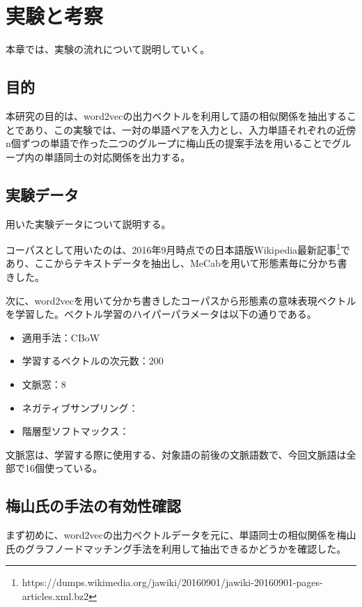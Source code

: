 \chapter{実験と考察}
本章では、実験の流れについて説明していく。

\section{目的}
本研究の目的は、word2vecの出力ベクトルを利用して語の相似関係を抽出することであり、この実験では、一対の単語ペアを入力とし、入力単語それぞれの近傍n個ずつの単語で作った二つのグループに梅山氏の提案手法を用いることでグループ内の単語同士の対応関係を出力する。

\section{実験データ}
用いた実験データについて説明する。

コーパスとして用いたのは、2016年9月時点での日本語版Wikipedia最新記事\footnote{https://dumps.wikimedia.org/jawiki/20160901/jawiki-20160901-pages-articles.xml.bz2}であり、ここからテキストデータを抽出し、MeCabを用いて形態素毎に分かち書きした。

次に、word2vecを用いて分かち書きしたコーパスから形態素の意味表現ベクトルを学習した。ベクトル学習のハイパーパラメータは以下の通りである。
\begin{itemize}
  \item 適用手法：CBoW
  \item 学習するベクトルの次元数：200
  \item 文脈窓：8
  \item ネガティブサンプリング：
  \item 階層型ソフトマックス：
\end{itemize}
文脈窓は、学習する際に使用する、対象語の前後の文脈語数で、今回文脈語は全部で16個使っている。

\section{梅山氏の手法の有効性確認}
まず初めに、word2vecの出力ベクトルデータを元に、単語同士の相似関係を梅山氏のグラフノードマッチング手法を利用して抽出できるかどうかを確認した。

